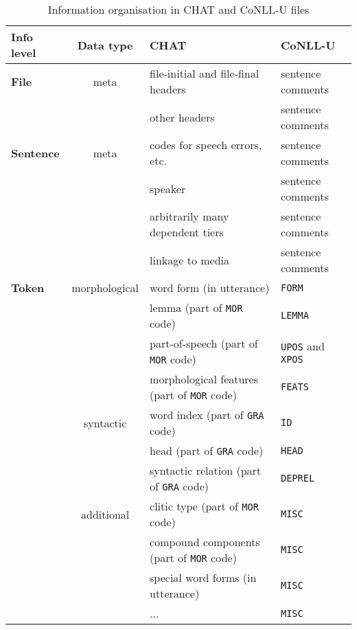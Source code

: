 \begin{table}[h!]
\caption {Information organisation in CHAT and CoNLL-U files} \label{tab:grmap}
\centering
\begin{tabularx}{\widefigurewidth}{@{}lcXX@{}}
\toprule
\textbf{Info level}          & \textbf{Data type} & \textbf{CHAT} & \textbf{CoNLL-U}\\ \midrule
\textbf{File}           & meta          & file-initial and file-final headers & sentence comments\\
                        &               & other headers & sentence comments\\\addlinespace\addlinespace
\textbf{Sentence}       & meta          & codes for speech errors, etc.& sentence comments\\
                        &               & speaker & sentence comments\\
                        &               & arbitrarily many dependent tiers & sentence comments\\
                        &               & linkage to media & sentence comments\\\addlinespace\addlinespace
\textbf{Token}          & morphological & word form (in utterance)& \texttt{FORM}\\
                        &               & lemma (part of \texttt{MOR} code)& \texttt{LEMMA}\\
                        &               & part-of-speech (part of \texttt{MOR} code)& \texttt{UPOS} and \texttt{XPOS}\\
                        &               & morphological features (part of \texttt{MOR} code)& \texttt{FEATS}\\\addlinespace
                        & syntactic     & word index (part of \texttt{GRA} code)& \texttt{ID}\\
                        &               & head (part of \texttt{GRA} code)& \texttt{HEAD}\\
                        &               & syntactic relation (part of \texttt{GRA} code)& \texttt{DEPREL}\\\addlinespace
                        & additional    & clitic type (part of \texttt{MOR} code)& \texttt{MISC}\\
                        &               & compound components (part of \texttt{MOR} code)& \texttt{MISC}\\
                        &               & special word forms (in utterance)& \texttt{MISC}\\
                        &               & ... & \texttt{MISC}\\\bottomrule
\end{tabularx}
\end{table}


